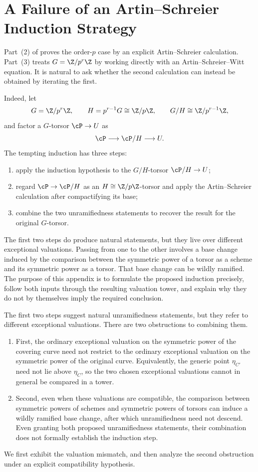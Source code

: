 \chapter{A Failure of an Artin--Schreier Induction Strategy}
\label{appendix:artin_schreier_induction_failure}
\label{section:a_wrong_path}
Part~(2) of  proves the order-$p$
case by an explicit Artin--Schreier calculation. Part~(3) treats
$G=\Z/p^r\Z$ by working directly with an Artin--Schreier--Witt equation.
It is natural to ask whether the second calculation can instead be obtained
by iterating the first.

Indeed, let
\[
G=\Z/p^r\Z,\qquad
H=p^{r-1}G\cong\Z/p\Z,\qquad
G/H\cong\Z/p^{r-1}\Z,
\]
and factor a $G$-torsor $\cP\to U$ as
\[
\cP\longrightarrow\cP/H\longrightarrow U.
\]
The tempting induction has three steps:
\begin{enumerate}
  \item apply the induction hypothesis to the $G/H$-torsor
        $\cP/H\to U$;
  \item regard $\cP\to\cP/H$ as an $H\cong\Z/p\Z$-torsor and apply the
        Artin--Schreier calculation after compactifying its base;
  \item combine the two unramifiedness statements to recover the result for
        the original $G$-torsor.
\end{enumerate}

{\color{red}
The first two steps do produce natural statements, but they live over
different exceptional valuations. Passing from one to the other involves a
base change induced by the comparison between the symmetric power of a
torsor as a scheme and its symmetric power as a torsor. That base change can
be wildly ramified. The purpose of this appendix is to formulate the proposed
induction precisely, follow both inputs through the resulting valuation
tower, and explain why they do not by themselves imply the required
conclusion.
\par}
{\color{blue}
The first two steps suggest natural unramifiedness statements, but they
refer to different exceptional valuations. There are two obstructions to
combining them.
\begin{enumerate}
\item First, the ordinary exceptional valuation on the symmetric
power of the covering curve need not restrict to the ordinary exceptional
valuation on the symmetric power of the original curve. Equivalently,
the generic point $\eta_{C'}$ need not lie above $\eta_C$, so the two
chosen exceptional valuations cannot in general be compared in a tower.
\item Second, even when
these valuations are compatible, the comparison between symmetric powers
of schemes and symmetric powers of torsors can induce a wildly ramified
base change, after which unramifiedness need not descend. Even granting
both proposed unramifiedness statements, their combination does not
formally establish the induction step.
\end{enumerate}
We first exhibit
the valuation mismatch, and then analyze the second obstruction under an
explicit compatibility hypothesis.
\par}





